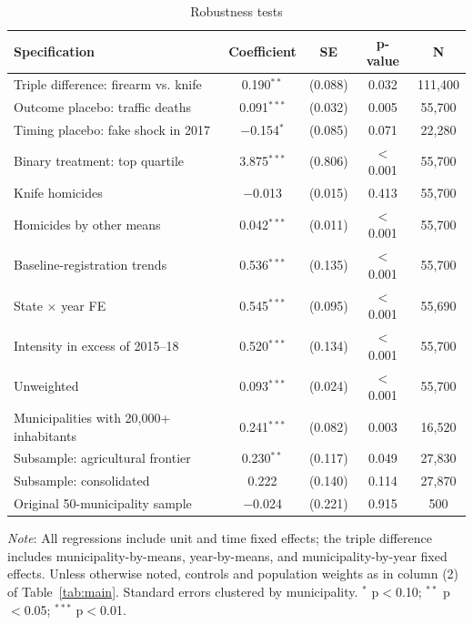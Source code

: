 \documentclass[11pt,a4paper]{article}
\newcommand{\nota}[1]{\par\vspace{2pt}\begin{minipage}{\linewidth}\footnotesize\textit{Note}: #1\end{minipage}}
\begin{document}
\begin{table}[H]
\centering\small
\caption{Robustness tests}\label{tab:rob}
\begin{tabular}{lcccc}
\toprule
Specification & Coefficient & SE & p-value & N \\
\midrule
Triple difference: firearm vs. knife & 0.190$^{**}$ & (0.088) & 0.032 & 111,400 \\
Outcome placebo: traffic deaths & 0.091$^{***}$ & (0.032) & 0.005 & 55,700 \\
Timing placebo: fake shock in 2017 & $-$0.154$^{*}$ & (0.085) & 0.071 & 22,280 \\
Binary treatment: top quartile & 3.875$^{***}$ & (0.806) & $<$0.001 & 55,700 \\
Knife homicides & $-$0.013 & (0.015) & 0.413 & 55,700 \\
Homicides by other means & 0.042$^{***}$ & (0.011) & $<$0.001 & 55,700 \\
Baseline-registration trends & 0.536$^{***}$ & (0.135) & $<$0.001 & 55,700 \\
State $\times$ year FE & 0.545$^{***}$ & (0.095) & $<$0.001 & 55,690 \\
Intensity in excess of 2015--18 & 0.520$^{***}$ & (0.134) & $<$0.001 & 55,700 \\
Unweighted & 0.093$^{***}$ & (0.024) & $<$0.001 & 55,700 \\
Municipalities with 20,000+ inhabitants & 0.241$^{***}$ & (0.082) & 0.003 & 16,520 \\
Subsample: agricultural frontier & 0.230$^{**}$ & (0.117) & 0.049 & 27,830 \\
Subsample: consolidated & 0.222 & (0.140) & 0.114 & 27,870 \\
Original 50-municipality sample & $-$0.024 & (0.221) & 0.915 & 500 \\
\bottomrule
\end{tabular}
\nota{All regressions include unit and time fixed effects; the triple difference includes municipality-by-means, year-by-means, and municipality-by-year fixed effects. Unless otherwise noted, controls and population weights as in column (2) of Table~\ref{tab:main}. Standard errors clustered by municipality. $^{*}$ p$<$0.10; $^{**}$ p$<$0.05; $^{***}$ p$<$0.01.}
\end{table}
\end{document}
